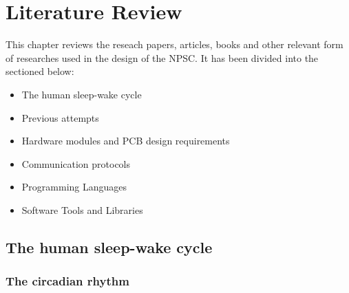 \chapter{Literature Review}

This chapter reviews the reseach papers, articles, books and other relevant form of researches used in the design of the NPSC. It has been divided into the sectioned below:
\begin{itemize}
\item The human sleep-wake cycle
\item Previous attempts
\item Hardware modules and PCB design requirements
\item Communication protocols
\item Programming Languages
\item Software Tools and Libraries
\end{itemize}

\section{The human sleep-wake cycle}
\subsection{The circadian rhythm}


